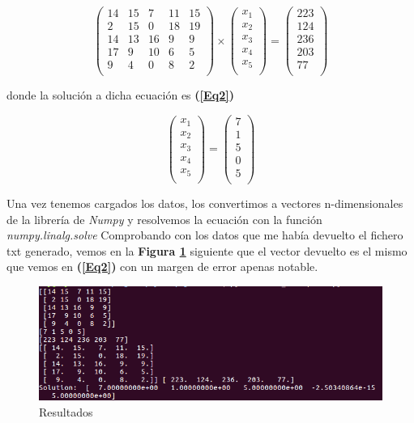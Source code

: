 \documentclass[12pt,twoside]{article}
\begin{document}
\begin{equation}
		\left(
			\begin{array}{ccccc}
				14  & 15 & 7 & 11 & 15 \\
				2 & 15  & 0 & 18  & 19 \\
				14  & 13 & 16 & 9  & 9 \\
				17  & 9  & 10  & 6 & 5 \\
				9 & 4 & 0  & 8  & 2 \\
			\end{array}
		\right)
		\times
		\left(
			\begin{array}{c}
				x_1 \\
				x_2 \\
				x_3 \\
				x_4 \\
				x_5 \\
			\end{array}
		\right)
		=
		\left(
			\begin{array}{c}
				223 \\
				124 \\
				236 \\
				203 \\
				77 \\
			\end{array}
		\right)
\label{Eq1}
	\end{equation}

donde la solución a dicha ecuación es \textbf{(\ref{Eq2})}

\begin{equation}
	\left(
		\begin{array}{c}
			x_1 \\
			x_2 \\
			x_3 \\
			x_4 \\
			x_5 \\
		\end{array}
	\right)
	=
	\left(
		\begin{array}{c}
			7 \\
			1 \\
			5 \\
			0 \\
			5 \\
		\end{array}
	\right)
	\label{Eq2}
\end{equation}

Una vez tenemos cargados los datos, los convertimos a vectores n-dimensionales de la librería de \textit{Numpy} y resolvemos la ecuación con la función \textit{numpy.linalg.solve}
Comprobando con los datos que me había devuelto el fichero txt generado, vemos en la \textbf{Figura \ref{fig:fig8}} siguiente que el vector devuelto es el mismo que vemos en \textbf{(\ref{Eq2})} con un margen de error apenas notable.


\begin{figure}
\begin{center}
	\includegraphics[width=1\textwidth]{23.png}
	\caption{Resultados}
	\label{fig:fig8}
\end{center}
\end{figure}
\end{document}
